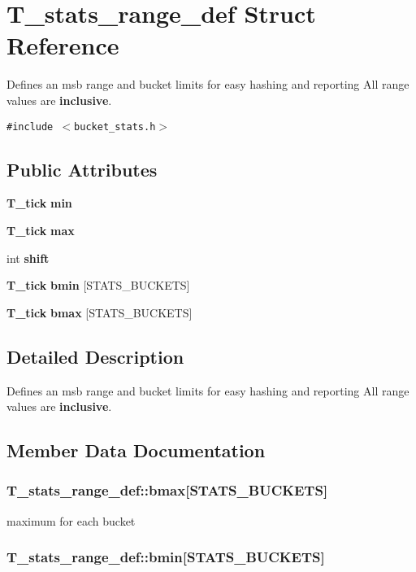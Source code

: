 \section{T\_\-stats\_\-range\_\-def Struct Reference}
\label{structT__stats__range__def}
Defines an msb range and bucket limits for easy hashing and reporting All range values are {\bf inclusive}. 


{\tt \#include $<$bucket\_\-stats.h$>$}

\subsection*{Public Attributes}
\begin{CompactItemize}
\item 
{\bf T\_\-tick} {\bf min}
\item 
{\bf T\_\-tick} {\bf max}
\item 
int {\bf shift}
\item 
{\bf T\_\-tick} {\bf bmin} [STATS\_\-BUCKETS]
\item 
{\bf T\_\-tick} {\bf bmax} [STATS\_\-BUCKETS]
\end{CompactItemize}


\subsection{Detailed Description}
Defines an msb range and bucket limits for easy hashing and reporting All range values are {\bf inclusive}.



\subsection{Member Data Documentation}
\subsubsection{ T\_\-stats\_\-range\_\-def::bmax[STATS\_\-BUCKETS]}\label{structT__stats__range__def_m4}


maximum for each bucket 
\subsubsection{ T\_\-stats\_\-range\_\-def::bmin[STATS\_\-BUCKETS]}\label{structT__stats__range__def_m3}


